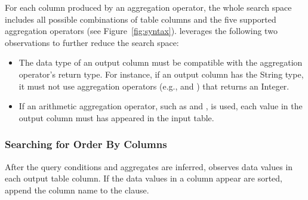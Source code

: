 For each column produced by an aggregation operator,
the whole search space includes all possible combinations
of table columns and the five supported aggregation operators (see Figure~\ref{fig:syntax}).
\ourtool leverages the following two observations to
further reduce the search space:

\begin{itemize}
\item The data type of an output column must be compatible with the
aggregation operator's return type. For instance, if an output column
has the String type, it must not use aggregation operators (e.g.,
 and ) that returns
an Integer. 

\item If an arithmetic aggregation operator, such as  and ,
is used, each value in the output column must has appeared in the input table.
\end{itemize}


\subsubsection{Searching for Order By Columns}
\label{sec:orderby}

After the query conditions and aggregates are inferred,
\ourtool observes data values in each output table column. If
the data values in a column appear are sorted, \ourtool
append the column name to the  clause.
